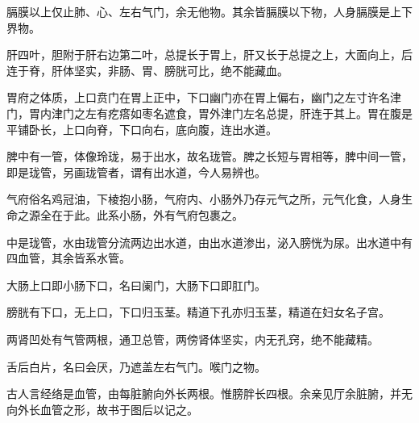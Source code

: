 \documentclass[a4paper,12pt,UTF8,twoside]{ctexbook}
\begin{document}
	膈膜以上仅止肺、心、左右气门，余无他物。其余皆膈膜以下物，人身膈膜是上下界物。
	
	肝四叶，胆附于肝右边第二叶，总提长于胃上，肝又长于总提之上，大面向上，后连于脊，肝体坚实，非肠、胃、膀胱可比，绝不能藏血。
	
	胃府之体质，上口贲门在胃上正中，下口幽门亦在胃上偏右，幽门之左寸许名津门，胃内津门之左有疙瘩如枣名遮食，胃外津门左名总提，肝连于其上。胃在腹是平铺卧长，上口向脊，下口向右，底向腹，连出水道。
	
	脾中有一管，体像玲珑，易于出水，故名珑管。脾之长短与胃相等，脾中间一管，即是珑管，另画珑管者，谓有出水道，今人易辨也。
	
	气府俗名鸡冠油，下棱抱小肠，气府内、小肠外乃存元气之所，元气化食，人身生命之源全在于此。此系小肠，外有气府包裹之。
	
	中是珑管，水由珑管分流两边出水道，由出水道渗出，泌入膀恍为尿。出水道中有四血管，其余皆系水管。
	
	大肠上口即小肠下口，名曰阑门，大肠下口即肛门。
	
	膀胱有下口，无上口，下口归玉茎。精道下孔亦归玉茎，精道在妇女名子宫。
	
	两肾凹处有气管两根，通卫总管，两傍肾体坚实，内无孔窍，绝不能藏精。
	
	舌后白片，名曰会厌，乃遮盖左右气门。喉门之物。
	
	古人言经络是血管，由每脏腑向外长两根。惟膀胖长四根。余亲见厅余脏腑，并无向外长血管之形，故书于图后以记之。
	
\end{document}
